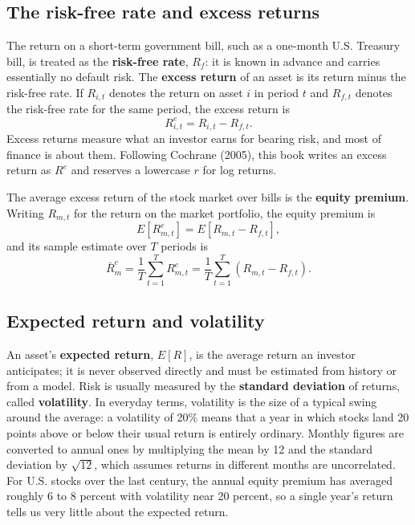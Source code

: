 \subsection{The risk-free rate and excess returns}
\label{sec:01-rf}

The return on a short-term government bill, such as a one-month U.S. Treasury bill, is treated as the \textbf{risk-free rate}, $R_f$: it is known in advance and carries essentially no default risk. 
The \textbf{excess return} of an asset is its return minus the risk-free rate. If $R_{i,t}$ denotes the return on asset $i$ in period $t$ and $R_{f,t}$ denotes the risk-free rate for the same period, the excess return is
\begin{equation}
R^{e}_{i,t} = R_{i,t} - R_{f,t}.
\label{eq:excess-return}
\end{equation}
Excess returns measure what an investor earns for bearing risk, and most of finance is about them. Following Cochrane (2005), this book writes an excess return as $R^{e}$ and reserves a lowercase $r$ for log returns.

The average excess return of the stock market over bills is the \textbf{equity premium}. Writing $R_{m,t}$ for the return on the market portfolio, the equity premium is
\begin{equation}
E\left[R^{e}_{m,t}\right] = E\left[R_{m,t} - R_{f,t}\right],
\label{eq:equity-premium}
\end{equation}
and its sample estimate over $T$ periods is
\begin{equation}
\bar{R}^{e}_{m} = \frac{1}{T}\sum_{t=1}^{T} R^{e}_{m,t} = \frac{1}{T}\sum_{t=1}^{T}\left(R_{m,t} - R_{f,t}\right).
\label{eq:equity-premium-sample}
\end{equation}




\subsection{Expected return and volatility}
\label{sec:01-expret}

An asset's \textbf{expected return}, $E[R]$, is the average return an investor anticipates; it is never observed directly and must be estimated from history or from a model. Risk is usually measured by the \textbf{standard deviation} of returns, called \textbf{volatility}. In everyday terms, volatility is the size of a typical swing around the average: a volatility of 20\% means that a year in which stocks land 20 points above or below their usual return is entirely ordinary. Monthly figures are converted to annual ones by multiplying the mean by 12 and the standard deviation by $\sqrt{12}$, which assumes returns in different months are uncorrelated. For U.S. stocks over the last century, the annual equity premium has averaged roughly 6 to 8 percent with volatility near 20 percent, so a single year's return tells us very little about the expected return.

